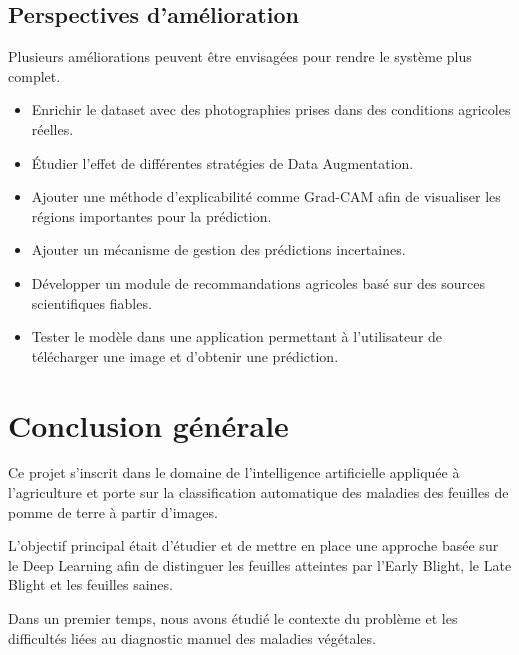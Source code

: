 \documentclass[12pt,a4paper,oneside]{report}
\begin{document}
\section{Perspectives d'amélioration}

Plusieurs améliorations peuvent être envisagées pour
rendre le système plus complet.

\begin{itemize}
    \item Enrichir le dataset avec des photographies
    prises dans des conditions agricoles réelles.

    \item Étudier l'effet de différentes stratégies
    de Data Augmentation.

    \item Ajouter une méthode d'explicabilité comme
    Grad-CAM afin de visualiser les régions importantes
    pour la prédiction.

    \item Ajouter un mécanisme de gestion des prédictions
    incertaines.

    \item Développer un module de recommandations
    agricoles basé sur des sources scientifiques fiables.

    \item Tester le modèle dans une application
    permettant à l'utilisateur de télécharger une image
    et d'obtenir une prédiction.
\end{itemize}


\chapter*{Conclusion générale}

Ce projet s'inscrit dans le domaine de l'intelligence
artificielle appliquée à l'agriculture et porte sur
la classification automatique des maladies des feuilles
de pomme de terre à partir d'images.

L'objectif principal était d'étudier et de mettre en place
une approche basée sur le Deep Learning afin de distinguer
les feuilles atteintes par l'Early Blight, le Late Blight
et les feuilles saines.

Dans un premier temps, nous avons étudié le contexte
du problème et les difficultés liées au diagnostic
manuel des maladies végétales.
\end{document}
